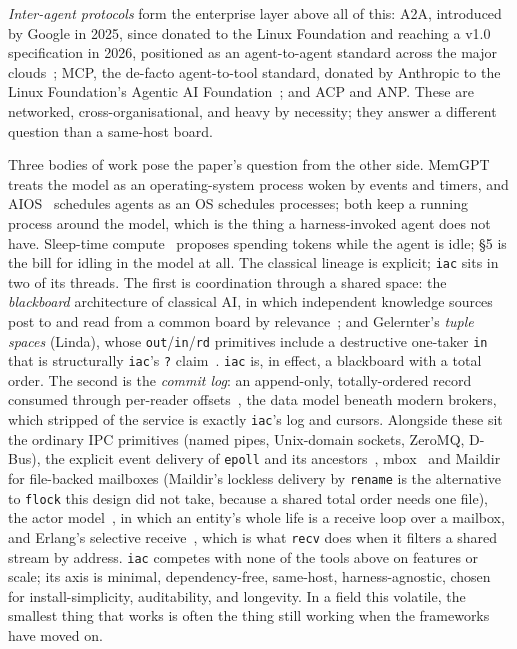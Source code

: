 \documentclass[11pt]{article}
\newcommand{\code}[1]{\texttt{#1}}
\begin{document}
\emph{Inter-agent protocols} form the enterprise layer above all of this: A2A, introduced by Google in 2025, since donated to the Linux Foundation and reaching a v1.0 specification in 2026, positioned as an agent-to-agent standard across the major clouds~\cite{a2a}; MCP, the de-facto agent-to-tool standard, donated by Anthropic to the Linux Foundation's Agentic AI Foundation~\cite{mcp}; and ACP and ANP. These are networked, cross-organisational, and heavy by necessity; they answer a different question than a same-host board.

Three bodies of work pose the paper's question from the other side. MemGPT~\cite{memgpt} treats the model as an operating-system process woken by events and timers, and AIOS~\cite{aios} schedules agents as an OS schedules processes; both keep a running process around the model, which is the thing a harness-invoked agent does not have. Sleep-time compute~\cite{sleeptime} proposes spending tokens while the agent is idle; \S5 is the bill for idling in the model at all. The classical lineage is explicit; \code{iac} sits in two of its threads. The first is coordination through a shared space: the \emph{blackboard} architecture of classical AI, in which independent knowledge sources post to and read from a common board by relevance~\cite{blackboard}; and Gelernter's \emph{tuple spaces} (Linda), whose \code{out}/\code{in}/\code{rd} primitives include a destructive one-taker \code{in} that is structurally \code{iac}'s \code{?} claim~\cite{linda}. \code{iac} is, in effect, a blackboard with a total order. The second is the \emph{commit log}: an append-only, totally-ordered record consumed through per-reader offsets~\cite{kafka2011,kreps,oneil1996}, the data model beneath modern brokers, which stripped of the service is exactly \code{iac}'s log and cursors. Alongside these sit the ordinary IPC primitives (named pipes, Unix-domain sockets, ZeroMQ, D-Bus), the explicit event delivery of \code{epoll} and its ancestors~\cite{banga1999}, mbox~\cite{mbox} and Maildir~\cite{maildir} for file-backed mailboxes (Maildir's lockless delivery by \code{rename} is the alternative to \code{flock} this design did not take, because a shared total order needs one file), the actor model~\cite{hewitt1973}, in which an entity's whole life is a receive loop over a mailbox, and Erlang's selective receive~\cite{armstrong2003}, which is what \code{recv} does when it filters a shared stream by address. \code{iac} competes with none of the tools above on features or scale; its axis is minimal, dependency-free, same-host, harness-agnostic, chosen for install-simplicity, auditability, and longevity. In a field this volatile, the smallest thing that works is often the thing still working when the frameworks have moved on.
\end{document}
